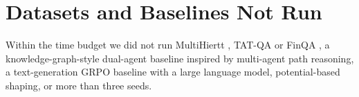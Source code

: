 \section{Datasets and Baselines Not Run}
\label{app:cut}

Within the time budget we did not run MultiHiertt \citep{zhao2022multihiertt}, TAT-QA \citep{zhu2021tatqa} or FinQA \citep{chen2021finqa}, a knowledge-graph-style dual-agent baseline inspired by multi-agent path reasoning, a text-generation GRPO baseline with a large language model, potential-based shaping, or more than three seeds.
